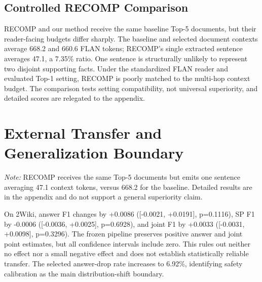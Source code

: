 \subsection{Controlled RECOMP Comparison}

RECOMP and our method receive the same baseline Top-5 documents, but their reader-facing budgets differ sharply. The baseline and selected document contexts average 668.2 and 660.6 FLAN tokens; RECOMP's single extracted sentence averages 47.1, a 7.35\% ratio. One sentence is structurally unlikely to represent two disjoint supporting facts. Under the standardized FLAN reader and evaluated Top-1 setting, RECOMP is poorly matched to the multi-hop context budget. The comparison tests setting compatibility, not universal superiority, and detailed scores are relegated to the appendix.

\section{External Transfer and Generalization Boundary}

\begin{table}[t]
\centering
\small
\caption{Supporting comparisons}
\label{tab:4}
\end{table}

\noindent\textit{Note:} RECOMP receives the same Top-5 documents but emits one sentence averaging 47.1 context tokens, versus 668.2 for the baseline. Detailed results are in the appendix and do not support a general superiority claim.

On 2Wiki, answer F1 changes by +0.0086 ([-0.0021, +0.0191], p=0.1116), SP F1 by -0.0006 ([-0.0036, +0.0025], p=0.6928), and joint F1 by +0.0033 ([-0.0031, +0.0098], p=0.3296). The frozen pipeline preserves positive answer and joint point estimates, but all confidence intervals include zero. This rules out neither no effect nor a small negative effect and does not establish statistically reliable transfer. The selected answer-drop rate increases to 6.92\%, identifying safety calibration as the main distribution-shift boundary.

